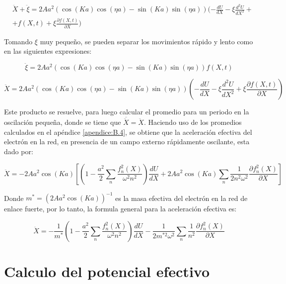\begin{equation}\label{eq:9.13}
    \begin{split} 
        &\ddot{X}+\ddot{\xi}=2Aa^2\left(\cos(Ka)\cos(\eta a)-\sin(Ka)\sin(\eta a)\right)(-\frac{dU}{dX}-\xi\frac{d^2U}{dX^2}+ \\ &+f(X,t) + \xi \frac{\partial f(X,t)}{\partial X} )
    \end{split}
\end{equation}

Tomando $\xi$ muy pequeño, se pueden separar los movimientos rápido y lento como en las siguientes expresiones:

\begin{equation}\label{eq:9.14}
    \ddot{\xi}=2Aa^2\left(\cos(Ka)\cos(\eta a)-\sin(Ka)\sin(\eta a)\right)f(X,t)
\end{equation}

\begin{equation}\label{eq:9.15}
   \ddot{X}=2Aa^2\left(\cos(Ka)\cos(\eta a)-\sin(Ka)\sin(\eta a)\right)\left(-\frac{dU}{dX}-\xi\frac{d^2U}{dX^2} + \xi \frac{\partial f(X,t)}{\partial X} \right)
\end{equation}

Este producto se resuelve, para luego calcular el promedio para un periodo en la oscilación pequeña, donde se tiene que $\overline{\ddot{X}}=\ddot{X}$. Haciendo uso de los promedios calculados en el apéndice \ref{apendice:B.4}, se obtiene que la aceleración efectiva del electrón en la red, en presencia de un campo externo rápidamente oscilante, esta dado por:

\begin{equation}\label{eq:9.16}
 \ddot{X}= -2Aa^2\cos(Ka)\left[\left(1-\frac{a^2}{2}\sum_n \frac{f_n^2(X)}{\omega^2n^2}\right)\frac{dU}{dX}+2Aa^2\cos(Ka)\sum_n \frac{1}{2n^2\omega^2}\frac{\partial f_n^2(X)}{\partial X}\right]
\end{equation}

Donde $m^*=(2Aa^2\cos(Ka))^{-1}$ es la masa efectiva del electrón en la red de enlace fuerte, por lo tanto, la formula general para la aceleración efectiva es:

\begin{equation}\label{eq:9.17}
 \ddot{X}= -\frac{1}{m^*}\left(1-\frac{a^2}{2}\sum_n \frac{f_n^2(X)}{\omega^2n^2}\right)\frac{dU}{dX}-\frac{1}{2m^{*2}\omega^2}\sum_n \frac{1}{n^2}\frac{\partial f_n^2(X)}{\partial X}
\end{equation}

\section{Calculo del potencial efectivo}\label{cap:9.1.2}

